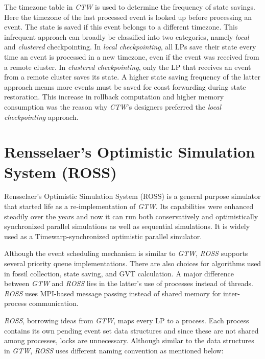 \documentclass[11pt]{book}
\begin{document}
The timezone table in \emph{CTW} is used to determine the frequency of state savings.  Here the timezone of
the last processed event is looked up before processing an event.  The state is saved if this event belongs to
a different timezone.  This infrequent approach can broadly be classified into two categories, namely
\emph{local} and \emph{clustered} checkpointing.  In \emph{local checkpointing}, all LPs save their state
every time an event is processed in a new timezone, even if the event was received from a remote cluster.  In
\emph{clustered checkpointing}, only the LP that receives an event from a remote cluster saves its state. A
higher state saving frequency of the latter approach means more events must be saved for coast forwarding
during state restoration.  This increase in rollback computation and higher memory consumption was the reason
why \emph{CTW}'s designers preferred the \emph{local checkpointing} approach.

\section[\textsc{ross}]{Rensselaer's Optimistic Simulation System (ROSS)}

Rensselaer's Optimistic Simulation System (ROSS) \cite{carothers-00} is a general purpose simulator that
started life as a re-implementation of \emph{GTW}.  Its capabilities were enhanced steadily over the years and
now it can run both conservatively and optimistically synchronized parallel simulations as well as sequential
simulations.  It is widely used as a Timewarp-synchronized optimistic parallel simulator.

Although the event scheduling mechanism is similar to \emph{GTW}, \emph{ROSS} supports several priority queue
implementations.  There are also choices for algorithms used in fossil collection, state saving, and GVT
calculation.  A major difference between \emph{GTW} and \emph{ROSS} lies in the latter's use of processes
instead of threads.  \emph{ROSS} uses MPI-based message passing instead of shared memory for inter-process
communication.

\emph{ROSS}, borrowing ideas from \emph{GTW}, maps every LP to a process.  Each process contains its own
pending event set data structures and since these are not shared among processes, locks are unnecessary.
Although similar to the data structures in \emph{GTW}, \emph{ROSS} uses different naming convention as
mentioned below:
\end{document}
